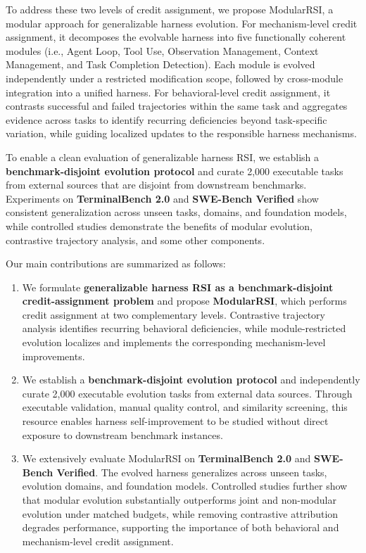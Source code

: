 \documentclass{article} %
\begin{document}
To address these two levels of credit assignment, we propose ModularRSI, a modular approach for generalizable harness evolution. For mechanism-level credit assignment, it decomposes the evolvable harness into five functionally coherent modules (i.e., Agent Loop, Tool Use, Observation Management, Context Management, and Task Completion Detection). Each module is evolved independently under a restricted modification scope, followed by cross-module integration into a unified harness. For behavioral-level credit assignment, it contrasts successful and failed trajectories within the same task and aggregates evidence across tasks to identify recurring deficiencies beyond task-specific variation, while guiding localized updates to the responsible harness mechanisms.

To enable a clean evaluation of generalizable harness RSI, we establish a \textbf{benchmark-disjoint evolution protocol} and curate 2,000 executable tasks from external sources that are disjoint from downstream benchmarks. Experiments on \textbf{TerminalBench 2.0} and \textbf{SWE-Bench Verified} show consistent generalization across unseen tasks, domains, and foundation models, while controlled studies demonstrate the benefits of modular evolution, contrastive trajectory analysis, and some other components.

Our main contributions are summarized as follows:
\begin{enumerate}
    \item We formulate \textbf{generalizable harness RSI as a benchmark-disjoint credit-assignment problem} and propose \textbf{ModularRSI}, which performs credit assignment at two complementary levels. Contrastive trajectory analysis identifies recurring behavioral deficiencies, while module-restricted evolution localizes and implements the corresponding mechanism-level improvements.
    
    \item We establish a \textbf{benchmark-disjoint evolution protocol} and independently curate 2,000 executable evolution tasks from external data sources. Through executable validation, manual quality control, and similarity screening, this resource enables harness self-improvement to be studied without direct exposure to downstream benchmark instances.
    
    \item We extensively evaluate ModularRSI on \textbf{TerminalBench 2.0} and \textbf{SWE-Bench Verified}. The evolved harness generalizes across unseen tasks, evolution domains, and foundation models. Controlled studies further show that modular evolution substantially outperforms joint and non-modular evolution under matched budgets, while removing contrastive attribution degrades performance, supporting the importance of both behavioral and mechanism-level credit assignment.
\end{enumerate}
\end{document}
